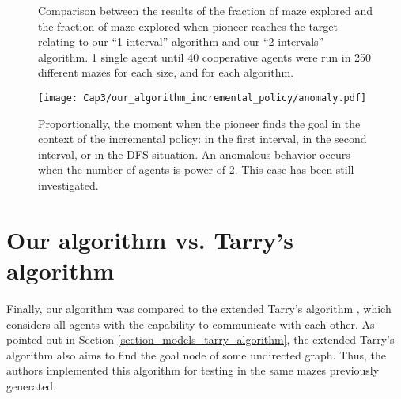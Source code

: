 \begin{figure}[ht!]
    \centering
    \qquad
    \qquad
    \newline
    \qquad
    \qquad
    \newline
    \qquad
    \caption{Comparison between the results of the fraction of maze explored and the fraction of maze explored when pioneer reaches the target relating to our ``1 interval'' algorithm and our ``2 intervals'' algorithm. 1 single agent until 40 cooperative agents were run in 250 different mazes for each size, and for each algorithm.}
    \label{our_algorithm_1I_vs_2I_fraction}
\end{figure}

\begin{figure}[ht!]
\centering
\texttt{[image: Cap3/our\_algorithm\_incremental\_policy/anomaly.pdf]}
\caption{Proportionally, the moment when the pioneer finds the goal in the context of the incremental policy: in the first interval, in the second interval, or in the DFS situation. An anomalous behavior occurs when the number of agents is power of 2. This case has been still investigated.}
\label{incremental_policy_anomaly}
\end{figure}

\section{Our algorithm vs. Tarry's algorithm}
\label{section_results_tarry_vs_our}

Finally, our algorithm was compared to the extended Tarry's algorithm \cite{KivelevitchCohen2010}, which considers all agents with the capability to communicate with each other. As pointed out in Section \ref{section_models_tarry_algorithm}, the extended Tarry's algorithm also aims to find the goal node of some undirected graph. Thus, the authors implemented this algorithm for testing in the same mazes previously generated.

